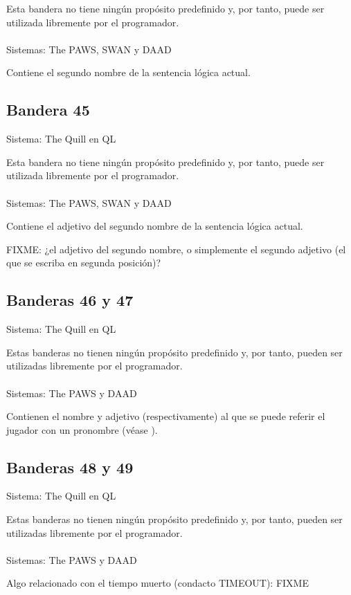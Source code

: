 \documentclass[11pt, a5paper]{article}
\newcommand{\quill}{\textsf{The Quill}\xspace}
\newcommand{\paw}{\textsf{The PAWS}\xspace}
\newcommand{\swan}{\textsf{SWAN}\xspace}
\newcommand{\daad}{\textsf{DAAD}\xspace}
\newcommand{\sistema}[1]{\noindent Sistema: #1 \nopagebreak}
\newcommand{\sistemas}[1]{\noindent Sistemas: #1 \nopagebreak}
\begin{document}
Esta bandera no tiene ningún propósito predefinido y, por tanto, puede ser utilizada libremente por el programador.
\\\ \\
\sistemas{\paw, \swan y \daad}

Contiene el segundo nombre de la sentencia lógica actual.

\subsection{Bandera 45}

\sistema{\quill en QL}

Esta bandera no tiene ningún propósito predefinido y, por tanto, puede ser utilizada libremente por el programador.
\\\ \\
\sistemas{\paw, \swan y \daad}

Contiene el adjetivo del segundo nombre de la sentencia lógica actual.

FIXME: ¿el adjetivo del segundo nombre, o simplemente el segundo adjetivo (el que se escriba en segunda posición)?

\subsection{Banderas 46 y 47}

\sistema{\quill en QL}

Estas banderas no tienen ningún propósito predefinido y, por tanto, pueden ser utilizadas libremente por el programador.
\\\ \\
\sistemas{\paw y \daad}

Contienen el nombre y adjetivo (respectivamente) al que se puede referir el jugador con un pronombre (véase ).

\subsection{Banderas 48 y 49}

\sistema{\quill en QL}

Estas banderas no tienen ningún propósito predefinido y, por tanto, pueden ser utilizadas libremente por el programador.
\\\ \\
\sistemas{\paw y \daad}

Algo relacionado con el tiempo muerto (condacto TIMEOUT): FIXME
\end{document}

